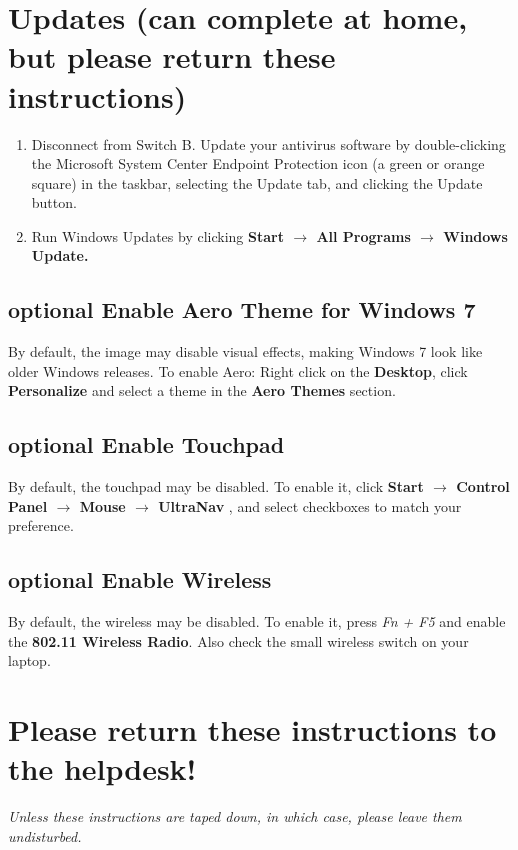 \documentclass[10pt]{article}
\begin{document}
\section{Updates (can complete at home, but please return these instructions)}
\begin{enumerate}
\item Disconnect from Switch B. Update your antivirus software by double-clicking the Microsoft System Center Endpoint Protection icon (a green or orange square) in the taskbar, selecting the Update tab, and clicking the Update button.
\item Run Windows Updates by clicking {\bf Start $\rightarrow$ All Programs $\rightarrow$ Windows Update.}
\end{enumerate}
\subsection{{\sc optional} Enable Aero Theme for Windows 7}
By default, the image may disable visual effects, making Windows 7 look like older Windows releases. To enable Aero:
Right click on the {\bf Desktop}, click {\bf Personalize} and select a theme in the {\bf Aero Themes} section.
\subsection{{\sc optional} Enable Touchpad}
By default, the touchpad may be disabled. To enable it, click {\bf Start $\rightarrow$ Control Panel $\rightarrow$ Mouse $\rightarrow$ UltraNav} , and select checkboxes to match your preference.
\subsection{{\sc optional} Enable Wireless}
By default, the wireless may be disabled. To enable it, press \emph{Fn + F5} and enable the {\bf 802.11 Wireless Radio}. Also check the small wireless switch on your laptop.
\section{Please return these instructions to the helpdesk!}
\emph{Unless these instructions are taped down, in which case, please leave them undisturbed.}
\end{document}
